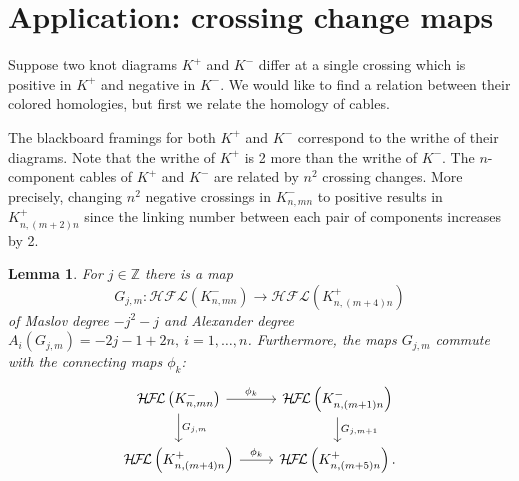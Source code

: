 \documentclass{amsart}
\newtheorem{lemma}[theorem]{Lemma}
\newcommand{\cHFL}{\mathcal{H\!F\! L}}
\newcommand{\Z}{\mathbb{Z}}
\newcommand{\EG}[1]{{\color{red}#1}}
\begin{document}

\section{Application: crossing change maps}

Suppose two knot diagrams $K^+$ and $K^-$ differ at a single crossing which is positive in $K^+$ and negative in $K^-$. We would like to find a relation between their colored homologies, but first we relate the homology of cables. 

The blackboard framings for both $K^+$ and $K^-$ correspond to the writhe of their diagrams. Note that the writhe of $K^+$ is 2 more than the writhe of $K^-$.  The $n$-component cables of $K^+$ and $K^-$ are related by $n^2$ crossing changes. More precisely, changing $n^2$ negative crossings in $K^-_{n,mn}$ to positive results in $K^+_{n,(m+2)n}$ since the linking number between each pair of components increases by 2.

 


\begin{lemma}
\label{lem: big blowdown}
For $j\in \Z$ there is a map 
$$
G_{j,m}: \cHFL\left(K^-_{n,mn}\right)\to \cHFL\left(K^+_{n,(m+4)n}\right)
$$
of Maslov degree $-j^2-j$ and Alexander degree $A_i(G_{j,m})=-2j-1+2n,\ i=1,\ldots,n$. Furthermore, the maps $G_{j,m}$ commute with the connecting maps $\phi_k$:
$$
\begin{tikzcd}
\cHFL\left(K^-_{n,mn}\right) \arrow{r}{\phi_k} \arrow{d}{G_{j,m}}& \cHFL\left(K^-_{n,(m+1)n}\right) \arrow{d}{G_{j,m+1}}\\
\cHFL\left(K^+_{n,(m+4)n}\right) \arrow{r}{\phi_k}& \cHFL\left(K^+_{n,(m+5)n}\right).
\end{tikzcd}
$$
\end{lemma}
\end{document}
